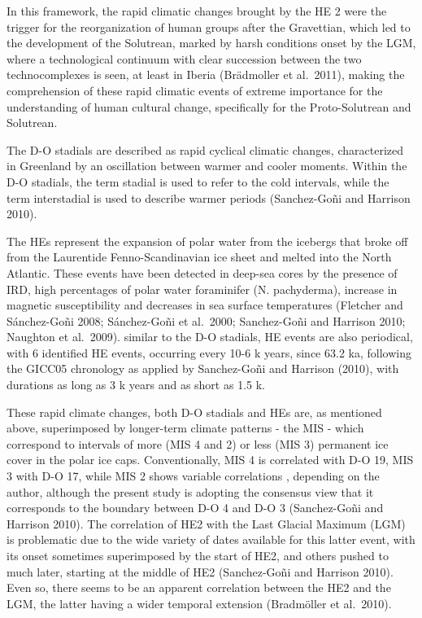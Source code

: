 \documentclass[12pt,twoside]{reedthesis}
\begin{document}
In this framework, the rapid climatic changes brought by the HE 2 were the trigger for the reorganization of human groups after the Gravettian, which led to the development of the Solutrean, marked by harsh conditions onset by the LGM, where a technological continuum with clear succession between the two technocomplexes is seen, at least in Iberia (Brädmoller et al.~2011), making the comprehension of these rapid climatic events of extreme importance for the understanding of human cultural change, specifically for the Proto-Solutrean and Solutrean.

The D-O stadials are described as rapid cyclical climatic changes, characterized in Greenland by an oscillation between warmer and cooler moments. Within the D-O stadials, the term stadial is used to refer to the cold intervals, while the term interstadial is used to describe warmer periods (Sanchez-Goñi and Harrison 2010).

The HEs represent the expansion of polar water from the icebergs that broke off from the Laurentide Fenno-Scandinavian ice sheet and melted into the North Atlantic. These events have been detected in deep-sea cores by the presence of IRD, high percentages of polar water foraminifer (N. pachyderma), increase in magnetic susceptibility and decreases in sea surface temperatures (Fletcher and Sánchez-Goñi 2008; Sánchez-Goñi et al.~2000; Sanchez-Goñi and Harrison 2010; Naughton et al.~2009). similar to the D-O stadials, HE events are also periodical, with 6 identified HE events, occurring every 10-6 k years, since 63.2 ka, following the GICC05 chronology as applied by Sanchez-Goñi and Harrison (2010), with durations as long as 3 k years and as short as 1.5 k.

These rapid climate changes, both D-O stadials and HEs are, as mentioned above, superimposed by longer-term climate patterns - the MIS - which correspond to intervals of more (MIS 4 and 2) or less (MIS 3) permanent ice cover in the polar ice caps. Conventionally, MIS 4 is correlated with D-O 19, MIS 3 with D-O 17, while MIS 2 shows variable correlations , depending on the author, although the present study is adopting the consensus view that it corresponds to the boundary between D-O 4 and D-O 3 (Sanchez-Goñi and Harrison 2010).
The correlation of HE2 with the Last Glacial Maximum (LGM) is problematic due to the wide variety of dates available for this latter event, with its onset sometimes superimposed by the start of HE2, and others pushed to much later, starting at the middle of HE2 (Sanchez-Goñi and Harrison 2010). Even so, there seems to be an apparent correlation between the HE2 and the LGM, the latter having a wider temporal extension (Bradmöller et al.~2010).
\end{document}
